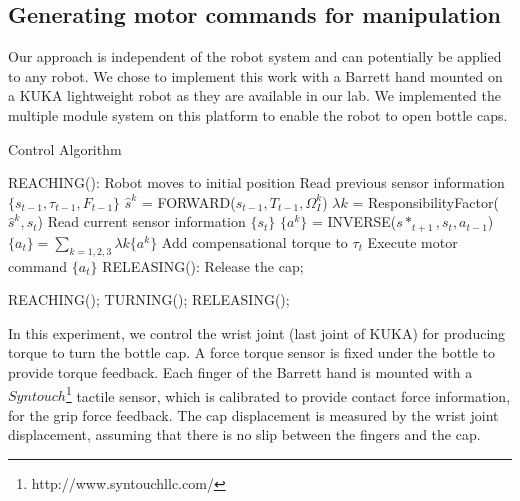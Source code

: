 \subsection{Generating motor commands for manipulation}
\label{cha4:sec3:command}
Our approach is independent of the robot system and can potentially be applied to any robot. We chose to implement this work with a Barrett hand mounted on a KUKA lightweight robot as they are available in our lab. We implemented the multiple module system on this platform to enable the robot to open bottle caps.

\begin{algorithm}
  \caption{Control Algorithm}
  \begin{algorithmic}[1]
    \State REACHING(): Robot moves to initial position\;
          \State Read previous sensor information $\{s_{t-1},\tau_{t-1},F_{t-1}\}$\;
            \State $\hat{s}^{k}$ = FORWARD($s_{t-1},T_{t-1},\Omega_I^k$) \;
          \EndFor
            \State $\lambda{k}$ = ResponsibilityFactor($\hat{s}^{k},s_t$) \;
          \EndFor
          \State Read current sensor information $\{s_{t}\}$\;
            \State $\{a^k\}$ = INVERSE($s*_{t+1},s_t,a_{t-1}$) \;
          \EndFor
          \State $\{a_t\} = \sum_{k=1,2,3}\lambda{k}\{a^k\}$\;\;
          \State Add compensational torque to $\tau_t$\;
          \State Execute motor command $\{a_t\}$ \;
          \State RELEASING(): Release the cap;
        \EndFunction
    \EndFor

        \State REACHING();
        \State TURNING();
        \State RELEASING();
    \EndWhile

  \end{algorithmic}
  \label{code:control}
\end{algorithm}


In this experiment, we control the wrist joint (last joint of KUKA) for producing torque to turn the bottle cap. A force torque sensor is fixed under the bottle to provide torque feedback. Each finger of the Barrett hand is mounted with a $Syntouch$\footnote{http://www.syntouchllc.com/} tactile sensor, which is calibrated to provide contact force information, for the grip force feedback. The cap displacement is measured by the wrist joint displacement, assuming that there is no slip between the fingers and the cap.

